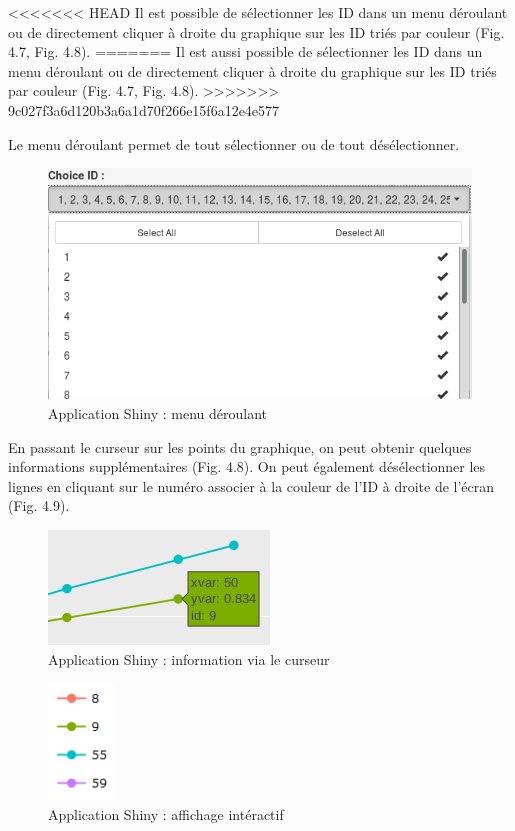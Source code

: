 \documentclass[]{report}
\begin{document}
<<<<<<< HEAD
Il est possible de sélectionner les ID dans un menu déroulant ou de
directement cliquer à droite du graphique sur les ID triés par couleur
(Fig. 4.7, Fig. 4.8).
=======
Il est aussi possible de sélectionner les ID dans un menu déroulant ou
de directement cliquer à droite du graphique sur les ID triés par
couleur (Fig. 4.7, Fig. 4.8).
>>>>>>> 9c027f3a6d120b3a6a1d70f266e15f6a12e4e577

Le menu déroulant permet de tout sélectionner ou de tout désélectionner.

\begin{figure}[h!]
\includegraphics[]{../image/menu-deroulant.PNG}
\caption{Application Shiny : menu déroulant}
\end{figure}

En passant le curseur sur les points du graphique, on peut obtenir
quelques informations supplémentaires (Fig. 4.8). On peut également
désélectionner les lignes en cliquant sur le numéro associer à la
couleur de l'ID à droite de l'écran (Fig. 4.9).

\begin{figure}[h!]
\includegraphics[]{../image/info-curseur.PNG}
\caption{Application Shiny : information via le curseur}
\end{figure}

\begin{figure}[h!]
\includegraphics[]{../image/shiny-selection.PNG}
\caption{Application Shiny : affichage intéractif}
\end{figure}
\end{document}
